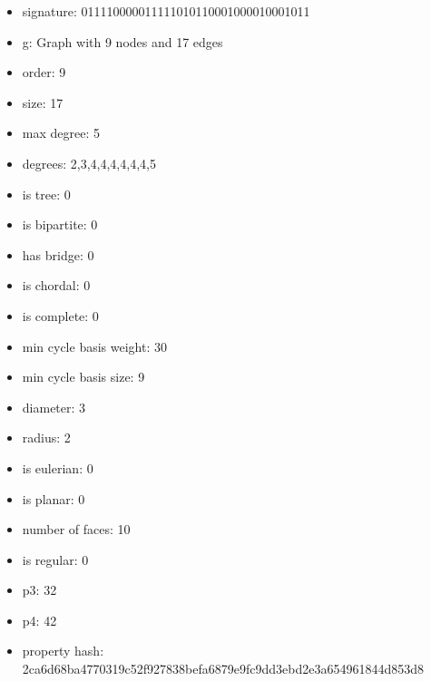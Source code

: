 \newpage
\begin{figure}
\end{figure}
\begin{itemize}
\item signature: 011110000011111010110001000010001011
\item g: Graph with 9 nodes and 17 edges
\item order: 9
\item size: 17
\item max degree: 5
\item degrees: 2,3,4,4,4,4,4,4,5
\item is tree: 0
\item is bipartite: 0
\item has bridge: 0
\item is chordal: 0
\item is complete: 0
\item min cycle basis weight: 30
\item min cycle basis size: 9
\item diameter: 3
\item radius: 2
\item is eulerian: 0
\item is planar: 0
\item number of faces: 10
\item is regular: 0
\item p3: 32
\item p4: 42
\item property hash: 2ca6d68ba4770319c52f927838befa6879e9fc9dd3ebd2e3a654961844d853d8
\end{itemize}
